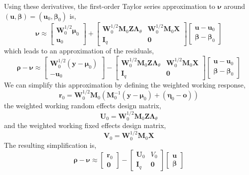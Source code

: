 \documentclass{jss}
\begin{document}
Using these derivatives, the first-order Taylor series approximation
to $\bm\nu$ around $(\bm u, \bm\beta) = (\bm u_0, \bm\beta_0)$ is,
\begin{equation}
\bm\nu \approx
\begin{bmatrix}
\bm W_0^{1/2}\bm \mu_0 \\
\bm u_0
\end{bmatrix} + 
\begin{bmatrix}
\bm W_0^{1/2}\bm M_0 \bm Z \bm\Lambda_\theta & \bm W_0^{1/2}\bm M_0 \bm X \\
\bm I_q & \bm 0
\end{bmatrix}
\begin{bmatrix}
\bm u - \bm u_0 \\
\bm\beta - \bm\beta_0 
\end{bmatrix}
\end{equation}
which leads to an approximation of the residuals,
\begin{equation}
\bm\rho - \bm\nu \approx
\begin{bmatrix}
\bm W_0^{1/2}(\bm y - \bm\mu_0) \\
-\bm u_0
\end{bmatrix} - 
\begin{bmatrix}
\bm W_0^{1/2}\bm M_0 \bm Z \bm\Lambda_\theta & \bm W_0^{1/2}\bm M_0 \bm X \\
\bm I_q & \bm 0
\end{bmatrix}
\begin{bmatrix}
\bm u - \bm u_0 \\
\bm\beta - \bm\beta_0 
\end{bmatrix}
\end{equation}
We can simplify this approximation by defining the weighted working
response,
\begin{equation}
\bm r_0 = \bm W_0^{1/2} \bm M_0 (\bm M_0^{-1} (\bm y - \bm\mu_0) +
(\bm\eta_0 - \bm o))
\label{eq:weightedworkingresiduals}
\end{equation}
the weighted working random effects design matrix,
\begin{equation}
\bm U_0 = \bm W_0^{1/2} \bm M_0 \bm Z \bm\Lambda_\theta
\end{equation}
and the weighted working fixed effects design matrix,
\begin{equation}
\bm V_0 = \bm W_0^{1/2} \bm M_0 \bm X
\end{equation}
The resulting simplification is,
\begin{equation}
\bm\rho - \bm\nu \approx
\begin{bmatrix}
\bm r_0 \\
\bm 0
\end{bmatrix} - 
\begin{bmatrix}
  \bm U_0 & V_0 \\
  \bm I_q & \bm 0
\end{bmatrix}
\begin{bmatrix}
\bm u \\
\bm\beta
\end{bmatrix}
\end{equation}
\end{document}
